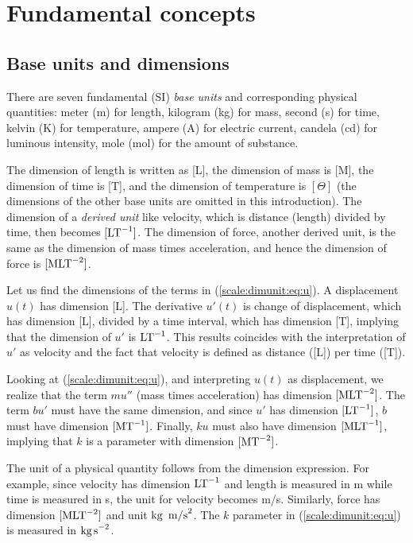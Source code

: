 \documentclass[graybox,envcountchap,sectrefs,final]{svmonodo}
\begin{document}
\section{Fundamental concepts}

\subsection{Base units and dimensions}



There are seven fundamental (SI) \emph{base units} and corresponding
physical quantities:
meter (m) for length,
kilogram (kg) for mass,
second (s) for time,
kelvin (K) for temperature,
ampere (A) for electric current,
candela (cd) for luminous intensity,
mole (mol) for the amount of substance.

The dimension of length is written as [L], the dimension of mass is
[M], the dimension of time is [T], and the dimension of temperature is
$[\Theta]$ (the dimensions of the other base units are omitted in
this introduction). The dimension of a \emph{derived unit} like velocity, which is
distance (length) divided by time, then becomes $[\hbox{LT}^{-1}]$.
The dimension of force, another derived unit, is the same as the
dimension of mass times acceleration, and hence the dimension of force is
$[\hbox{MLT}^{-2}]$.

Let us find the dimensions of the terms in (\ref{scale:dimunit:eq:u}).
A displacement $u(t)$ has dimension [L]. The derivative $u'(t)$ is
change of displacement, which has dimension [L], divided by a time
interval, which has dimension [T], implying that the dimension of $u'$
is $\hbox{LT}^{-1}$. This results coincides with the interpretation of
$u'$ as velocity and the fact that velocity is defined as distance
([L]) per time ([T]).

Looking at (\ref{scale:dimunit:eq:u}), and interpreting $u(t)$
as displacement, we realize that the term $mu''$
(mass times acceleration) has dimension $[\hbox{MLT}^{-2}]$.  The term
$bu'$ must have the same dimension, and since $u'$ has dimension
$[\hbox{LT}^{-1}]$, $b$ must have dimension $[\hbox{MT}^{-1}]$.
Finally, $ku$ must also have dimension $[\hbox{MLT}^{-1}]$, implying that $k$
is a parameter with dimension $[\hbox{MT}^{-2}]$.

The unit of a physical quantity follows from the dimension expression.
For example, since velocity has dimension $\hbox{LT}^{-1}$ and length
is measured in m while time is measured in s, the unit for velocity
becomes m/s. Similarly, force has dimension $[\hbox{MLT}^{-2}]$ and
unit $\hbox{kg\, m/s}^2$. The $k$ parameter in (\ref{scale:dimunit:eq:u})
is measured in $\hbox{kg\,s}^{-2}$.
\end{document}
